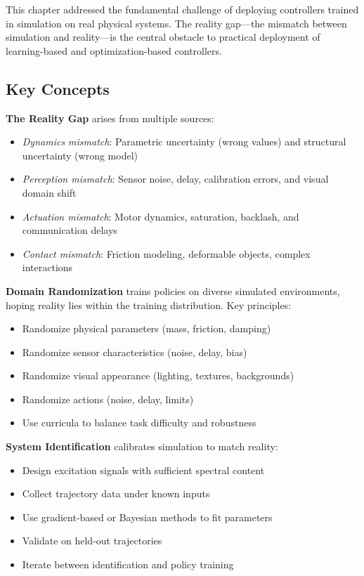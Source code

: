 This chapter addressed the fundamental challenge of deploying controllers trained in simulation on real physical systems. The reality gap---the mismatch between simulation and reality---is the central obstacle to practical deployment of learning-based and optimization-based controllers.

\subsection{Key Concepts}

\textbf{The Reality Gap} arises from multiple sources:
\begin{itemize}
    \item \textit{Dynamics mismatch}: Parametric uncertainty (wrong values) and structural uncertainty (wrong model)
    \item \textit{Perception mismatch}: Sensor noise, delay, calibration errors, and visual domain shift
    \item \textit{Actuation mismatch}: Motor dynamics, saturation, backlash, and communication delays
    \item \textit{Contact mismatch}: Friction modeling, deformable objects, complex interactions
\end{itemize}

\textbf{Domain Randomization} trains policies on diverse simulated environments, hoping reality lies within the training distribution. Key principles:
\begin{itemize}
    \item Randomize physical parameters (mass, friction, damping)
    \item Randomize sensor characteristics (noise, delay, bias)
    \item Randomize visual appearance (lighting, textures, backgrounds)
    \item Randomize actions (noise, delay, limits)
    \item Use curricula to balance task difficulty and robustness
\end{itemize}

\textbf{System Identification} calibrates simulation to match reality:
\begin{itemize}
    \item Design excitation signals with sufficient spectral content
    \item Collect trajectory data under known inputs
    \item Use gradient-based or Bayesian methods to fit parameters
    \item Validate on held-out trajectories
    \item Iterate between identification and policy training
\end{itemize}

